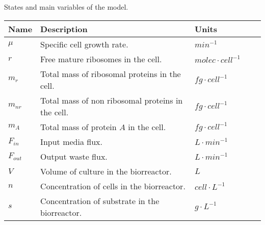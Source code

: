 \begin{specialtable}[H] 
\centering
\caption{States and main variables of the model.}
\label{tab:states}
\begin{tabular}{lllll}
\toprule
\textbf{Name}	& \textbf{Description}	& \textbf{Units} \\
\midrule
	$\mu$ & Specific cell growth rate. & $min^{-1}$\\
	$r$ & Free mature ribosomes in the cell. & $molec \cdot cell^{-1}$\\
	$m_r$ & Total mass of ribosomal proteins in the cell. & $fg \cdot cell^{-1}$\\
	$m_{nr}$ & Total mass of non ribosomal proteins in the cell. & $fg \cdot cell^{-1}$\\
	$m_A$ & Total mass of protein $A$ in the cell. & $fg \cdot cell^{-1}$\\
	$F_{in}$ & Input media flux. & $L \cdot min^{-1}$\\
	$F_{out}$ & Output waste flux. & $L \cdot min^{-1}$\\
	$V$ & Volume of culture in the biorreactor. & $L$\\
	$n$ & Concentration of cells in the biorreactor. & $cell \cdot L^{-1}$\\
	$s$ & Concentration of substrate in the biorreactor. & $g \cdot L^{-1}$\\
\bottomrule
\end{tabular}
\end{specialtable}
